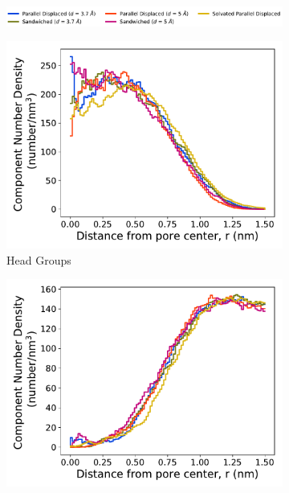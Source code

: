\documentclass{article}
\begin{document}
  \begin{figure}[!htb]
  \centering
  \begin{subfigure}{\textwidth}
  \includegraphics[width=\textwidth]{regional_density_legend.pdf}
  \end{subfigure}
  \begin{subfigure}{0.32\textwidth}
        \includegraphics[width=1\linewidth]{head_group_density.pdf}
        \caption{Head Groups}
        \label{fig:head_groups_regional_density}
  \end{subfigure}
  \begin{subfigure}{0.32\textwidth}
        \includegraphics[width=1\linewidth]{tails_density.pdf}

\end{subfigure}
\end{figure}
\end{document}

